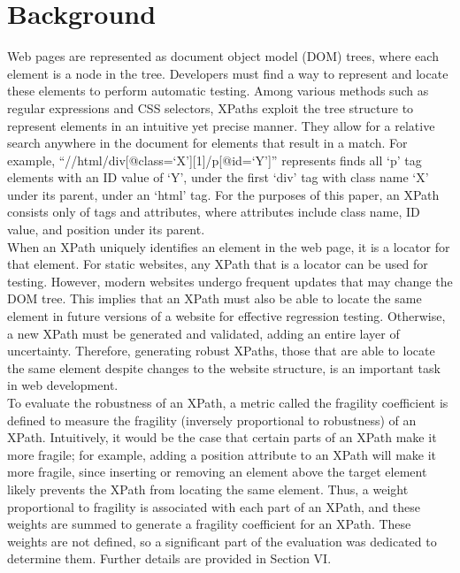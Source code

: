 \documentclass[format=acmlarge, nonacm=true]{acmart}
\begin{document}
\section{Background}
Web pages are represented as document object model (DOM) trees, where each element is a node in the tree. Developers must find a way to represent and locate these elements to perform automatic testing. Among various methods such as regular expressions and CSS selectors, XPaths exploit the tree structure to represent elements in an intuitive yet precise manner. They allow for a relative search anywhere in the document for elements that result in a match. For example, “//html/div[@class=‘X’][1]/p[@id=‘Y’]” represents finds all ‘p’ tag elements with an ID value of ‘Y’, under the first ‘div’ tag with class name ‘X’ under its parent, under an ‘html’ tag.  For the purposes of this paper, an XPath consists only of tags and attributes, where attributes include class name, ID value, and position under its parent.\\
When an XPath uniquely identifies an element in the web page, it is a locator for that element. For static websites, any XPath that is a locator can be used for testing. However, modern websites undergo frequent updates that may change the DOM tree. This implies that an XPath must also be able to locate the same element in future versions of a website for effective regression testing. Otherwise, a new XPath must be generated and validated, adding an entire layer of uncertainty. Therefore, generating robust XPaths, those that are able to locate the same element despite changes to the website structure, is an important task in web development.\\
To evaluate the robustness of an XPath, a metric called the fragility coefficient is defined to measure the fragility (inversely proportional to robustness) of an XPath. Intuitively, it would be the case that certain parts of an XPath make it more fragile; for example, adding a position attribute to an XPath will make it more fragile, since inserting or removing an element above the target element likely prevents the XPath from locating the same element. Thus, a weight proportional to fragility is associated with each part of an XPath, and these weights are summed to generate a fragility coefficient for an XPath. These weights are not defined, so a significant part of the evaluation was dedicated to determine them. Further details are provided in Section VI.\\
\end{document}
